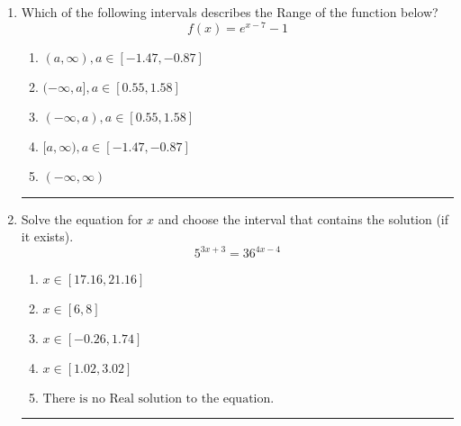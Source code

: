 \documentclass[14pt]{extbook}
\newcommand{\litem}[1]{\item#1\hspace*{-1cm}\rule{\textwidth}{0.4pt}}
\begin{document}
\begin{enumerate}
{\begin{enumerate}[label=\Alph*.]
\end{enumerate} }
\litem{
Which of the following intervals describes the Range of the function below?\[ f(x) = e^{x-7}-1 \]\begin{enumerate}[label=\Alph*.]
\item \( (a, \infty), a \in [-1.47, -0.87] \)
\item \( (-\infty, a], a \in [0.55, 1.58] \)
\item \( (-\infty, a), a \in [0.55, 1.58] \)
\item \( [a, \infty), a \in [-1.47, -0.87] \)
\item \( (-\infty, \infty) \)

\end{enumerate} }
\litem{
Solve the equation for $x$ and choose the interval that contains the solution (if it exists).\[ 5^{3x+3} = 36^{4x-4} \]\begin{enumerate}[label=\Alph*.]
\item \( x \in [17.16, 21.16] \)
\item \( x \in [6, 8] \)
\item \( x \in [-0.26, 1.74] \)
\item \( x \in [1.02, 3.02] \)
\item \( \text{There is no Real solution to the equation.} \)

\end{enumerate} }
\end{enumerate}
\end{document}
